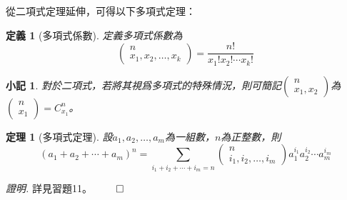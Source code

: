 \documentclass[12pt]{article}
\newtheorem{definition}{定義}
\newtheorem*{theorem}{定理}
\newtheorem*{remark}{小記}
\renewenvironment*{proof}{\textit{證明.}}{\hfill$\qed$}
\begin{document}
    從二項式定理延伸，可得以下多項式定理：

    \begin{definition}[多項式係數]
        定義多項式係數為$$\begin{pmatrix}
            n\\x_1,x_2,\dots,x_k
        \end{pmatrix}=\frac{n!}{x_1!x_2!\cdots x_k!}$$
    \end{definition}

    \begin{remark}
        對於二項式，若將其視爲多項式的特殊情況，則可簡記$\begin{pmatrix}
            n\\x_1,x_2
        \end{pmatrix}$為$\begin{pmatrix}
            n\\x_1
        \end{pmatrix}=C_{x_1}^n$。
    \end{remark}

    \begin{theorem}[多項式定理]
        設$a_1,a_2,\dots,a_m$為一組數，$n$為正整數，則$$(a_1+a_2+\cdots+a_m)^n=\sum_{i_1+i_2+\cdots+i_m=n}\begin{pmatrix}
            n\\i_1,i_2,\dots,i_m
        \end{pmatrix}a_1^{i_1}a_2^{i_2}\cdots a_m^{i_m}$$
    \end{theorem}

    \begin{proof}
        詳見習題11。
    \end{proof}
\end{document}
